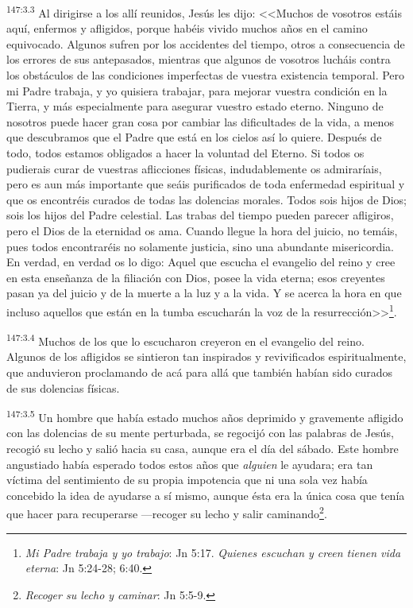 \par 
\textsuperscript{147:3.3} Al dirigirse a los allí reunidos, Jesús les dijo: <<Muchos de vosotros estáis aquí, enfermos y afligidos, porque habéis vivido muchos años en el camino equivocado. Algunos sufren por los accidentes del tiempo, otros a consecuencia de los errores de sus antepasados, mientras que algunos de vosotros lucháis contra los obstáculos de las condiciones imperfectas de vuestra existencia temporal. Pero mi Padre trabaja, y yo quisiera trabajar, para mejorar vuestra condición en la Tierra, y más especialmente para asegurar vuestro estado eterno. Ninguno de nosotros puede hacer gran cosa por cambiar las dificultades de la vida, a menos que descubramos que el Padre que está en los cielos así lo quiere. Después de todo, todos estamos obligados a hacer la voluntad del Eterno. Si todos os pudierais curar de vuestras aflicciones físicas, indudablemente os admiraríais, pero es aun más importante que seáis purificados de toda enfermedad espiritual y que os encontréis curados de todas las dolencias morales. Todos sois hijos de Dios; sois los hijos del Padre celestial. Las trabas del tiempo pueden parecer afligiros, pero el Dios de la eternidad os ama. Cuando llegue la hora del juicio, no temáis, pues todos encontraréis no solamente justicia, sino una abundante misericordia. En verdad, en verdad os lo digo: Aquel que escucha el evangelio del reino y cree en esta enseñanza de la filiación con Dios, posee la vida eterna; esos creyentes pasan ya del juicio y de la muerte a la luz y a la vida. Y se acerca la hora en que incluso aquellos que están en la tumba escucharán la voz de la resurrección>>\footnote{\textit{Mi Padre trabaja y yo trabajo}: Jn 5:17. \textit{Quienes escuchan y creen tienen vida eterna}: Jn 5:24-28; 6:40.}.

\par 
\textsuperscript{147:3.4} Muchos de los que lo escucharon creyeron en el evangelio del reino. Algunos de los afligidos se sintieron tan inspirados y revivificados espiritualmente, que anduvieron proclamando de acá para allá que también habían sido curados de sus dolencias físicas.

\par 
\textsuperscript{147:3.5} Un hombre que había estado muchos años deprimido y gravemente afligido con las dolencias de su mente perturbada, se regocijó con las palabras de Jesús, recogió su lecho y salió hacia su casa, aunque era el día del sábado. Este hombre angustiado había esperado todos estos años que \textit{alguien} le ayudara; era tan víctima del sentimiento de su propia impotencia que ni una sola vez había concebido la idea de ayudarse a sí mismo, aunque ésta era la única cosa que tenía que hacer para recuperarse ---recoger su lecho y salir caminando\footnote{\textit{Recoger su lecho y caminar}: Jn 5:5-9.}.

